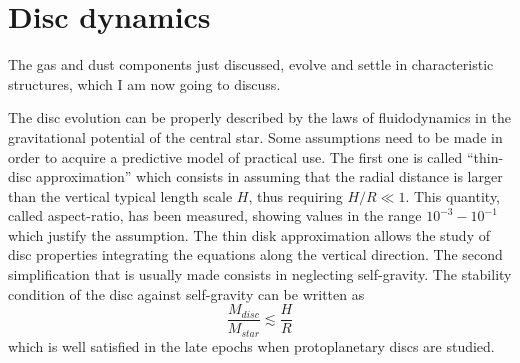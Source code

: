 \documentclass[a4paper,10pt]{report}
\begin{document}
\section{Disc dynamics}

The gas and dust components just discussed, 
evolve and settle in characteristic structures, which I am now going to discuss.

The disc evolution can be properly described by the laws of fluidodynamics in the gravitational potential of the central star.
Some assumptions need to be made in order to acquire a predictive model of practical use.
The first one is called ``thin-disc approximation'' which consists in assuming that the radial distance is larger than 
the vertical typical length scale $H$, thus requiring $H/R \ll 1$. This quantity, called aspect-ratio, has been measured, 
showing values in the range $10^{-3}-10^{-1}$ which justify the assumption. The thin disk approximation allows the study of disc properties integrating
the equations along the vertical direction.
The second simplification that is usually made consists in neglecting self-gravity.
The stability condition of the disc against self-gravity can be written \citep[p. 40]{book_planet_form} as
\begin{equation}
    \frac{M_{disc}}{M_{star}} \lesssim  \frac{H}{R}
\end{equation}
which is well satisfied in the late epochs when protoplanetary discs are studied.
\end{document}
